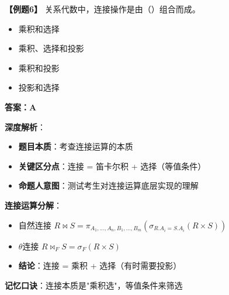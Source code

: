 \documentclass[12pt, a4paper]{article}
\newenvironment{bluebox}[1]{%
  \begin{trivlist}
  \item[\hskip\labelsep \textbf{#1}]
  \setlength{\parskip}{0.5ex}
  \setlength{\itemsep}{0.5ex}
}{%
  \end{trivlist}
}
\begin{document}
\begin{bluebox}{例题6：关系运算组合}
	\textbf{【例题6】} 关系代数中，连接操作是由（\quad）组合而成。

	\begin{itemize}
		\item[A)] 乘积和选择
		\item[B)] 乘积、选择和投影
		\item[C)] 乘积和投影
		\item[D)] 投影和选择
	\end{itemize}

	\textbf{答案：A}

	\textbf{深度解析}：

	\begin{itemize}
		\item \textbf{题目本质}：考查连接运算的本质
		\item \textbf{关键区分点}：连接 = 笛卡尔积 + 选择（等值条件）
		\item \textbf{命题人意图}：测试考生对连接运算底层实现的理解
	\end{itemize}

	\textbf{连接运算分解}：

	\begin{itemize}
		\item 自然连接 $R \Join S = \pi_{A_1,...,A_n,B_1,...,B_m}(\sigma_{R.A_i=S.A_i}(R \times S))$
		\item $\theta$连接 $R \Join_{F} S = \sigma_F(R \times S)$
		\item \textbf{结论}：连接 = 乘积 + 选择（有时需要投影）
	\end{itemize}

	\textbf{记忆口诀}：连接本质是"乘积选"，等值条件来筛选
\end{bluebox}
\end{document}
